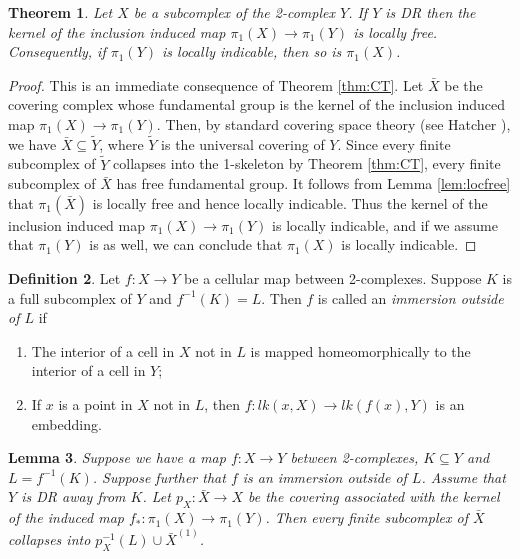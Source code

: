 \documentclass[12pt]{amsart}
\newtheorem{thm}{Theorem}[section]
\newtheorem{lemma}[thm]{Lemma}
\theoremstyle{definition}
\newtheorem{defn}[thm]{Definition}
\begin{document}
\begin{thm}\label{thm:easycase} Let $X$ be a subcomplex of the 2-complex $Y$. If $Y$ is DR then the kernel of the inclusion induced map $\pi_1(X)\to \pi_1(Y)$ is locally free. Consequently, if $\pi_1(Y)$ is locally indicable, then so is $\pi_1(X)$.
\end{thm}

\begin{proof} This is an immediate consequence of Theorem \ref{thm:CT}. Let $\bar X$ be the covering complex whose fundamental group is the kernel of the inclusion induced map $\pi_1(X)\to \pi_1(Y)$. Then, by standard covering space theory (see Hatcher \cite{hatcher}), we have $\bar X\subseteq \tilde Y$, where $\tilde Y$ is the universal covering of $Y$. Since every finite subcomplex of $\tilde Y$ collapses into the 1-skeleton by Theorem \ref{thm:CT}, every finite subcomplex of $\bar X$ has free fundamental group. It follows from Lemma \ref{lem:locfree} that $\pi_1(\bar X)$ is locally free and hence locally indicable. Thus the kernel of the inclusion induced map $\pi_1(X)\to \pi_1(Y)$ is locally indicable, and if we assume that $\pi_1(Y)$ is as well, we can conclude that $\pi_1(X)$ is locally indicable.
\end{proof}



\begin{defn} Let $f\colon X\to Y$ be a cellular map between 2-complexes. Suppose $K$ is a full subcomplex of $Y$ and $f^{-1}(K)=L$. Then $f$ is called an {\em immersion outside of $L$} if
\begin{enumerate}
\item The interior of a cell in $X$ not in $L$ is mapped homeomorphically to the interior of a cell in $Y$;
\item If $x$ is a point in $X$ not in $L$, then $f\colon lk(x,X)\to lk(f(x),Y)$ is an embedding.
\end{enumerate}
\end{defn}

\begin{lemma}\label{lem:imoutside} Suppose we have a map $f\colon X\to Y$ between 2-complexes, $K\subseteq Y$ and $L=f^{-1}(K)$. Suppose further that $f$ is an immersion outside of $L$. Assume that $Y$ is DR away from $K$. Let $p_X\colon \bar X\to X $ be the covering associated with the kernel of the induced map $f_*\colon \pi_1(X)\to \pi_1(Y)$. Then every finite subcomplex of $\bar X$ collapses into $p_X^{-1}(L)\cup \bar X^{(1)}$.
\end{lemma}
\end{document}
